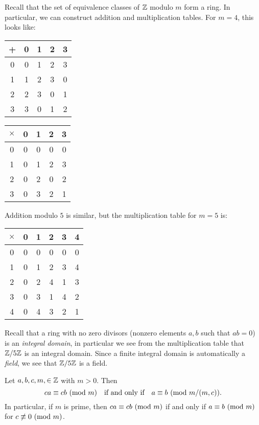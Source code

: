 \begin{remark}
  Recall that the set of equivalence
  classes of $\mathbb{Z}$ modulo $m$ form a ring.
  In particular, we can construct
  addition and multiplication tables.
  For $m = 4$, this looks like:
  \begin{center}
    \begin{tabular}{c|cccc}
      + & 0 & 1 & 2 & 3 \\
      \hline
      0 & 0 & 1 & 2 & 3 \\
      1 & 1 & 2 & 3 & 0 \\
      2 & 2 & 3 & 0 & 1 \\
      3 & 3 & 0 & 1 & 2
    \end{tabular}
    \quad \quad \quad
    \begin{tabular}{c|cccc}
      $\times$ & 0 & 1 & 2 & 3 \\
      \hline
      0 & 0 & 0 & 0 & 0 \\
      1 & 0 & 1 & 2 & 3 \\
      2 & 0 & 2 & 0 & 2 \\
      3 & 0 & 3 & 2 & 1
    \end{tabular}
  \end{center}
  Addition modulo $5$ is similar, but
  the multiplication table for $m = 5$ is:
  \begin{center}
    \begin{tabular}{c|ccccc}
      $\times$ & 0 & 1 & 2 & 3 & 4 \\
      \hline
      0 & 0 & 0 & 0 & 0 & 0 \\
      1 & 0 & 1 & 2 & 3 & 4 \\
      2 & 0 & 2 & 4 & 1 & 3 \\
      3 & 0 & 3 & 1 & 4 & 2 \\
      4 & 0 & 4 & 3 & 2 & 1
    \end{tabular}
  \end{center}
  Recall that a ring with no zero divisors
  (nonzero elements $a, b$ such that $ab = 0$)
  is an \emph{integral domain}, in
  particular we see from the multiplication
  table that $\mathbb{Z} / 5\mathbb{Z}$ is an integral
  domain. Since a finite integral domain
  is automatically a \emph{field}, we
  see that $\mathbb{Z} / 5\mathbb{Z}$ is a field.
\end{remark}

\begin{prop}
  Let $a, b, c, m, \in \mathbb{Z}$ with $m > 0$.
  Then
  \[
    ca \equiv cb \ (\mathrm{mod}\ m)
    \quad \text{if and only if} \quad
    a \equiv b \ (\mathrm{mod}\ m / (m, c)).
  \]
  In particular, if $m$ is prime, then
  $ca \equiv cb \ (\mathrm{mod}\ m)$
  if and only if $a \equiv b \ (\mathrm{mod}\ m)$
  for $c \not\equiv 0 \ (\mathrm{mod}\ m)$.
\end{prop}

